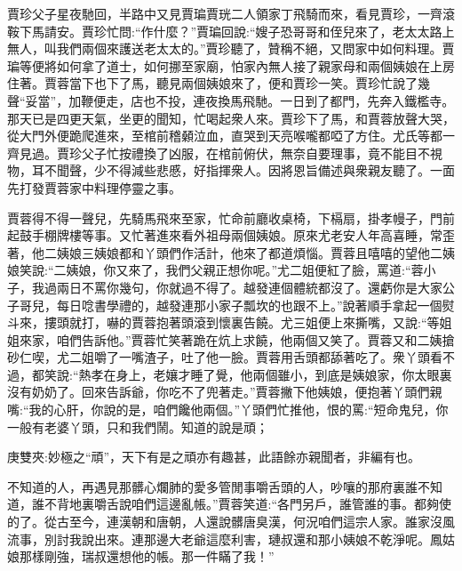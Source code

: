 \begin{parag}
    賈珍父子星夜馳回，半路中又見賈㻞賈珖二人領家丁飛騎而來，看見賈珍，一齊滾鞍下馬請安。賈珍忙問:“作什麼？”賈㻞回說:“嫂子恐哥哥和侄兒來了，老太太路上無人，叫我們兩個來護送老太太的。”賈珍聽了，贊稱不絕，又問家中如何料理。賈㻞等便將如何拿了道士，如何挪至家廟，怕家內無人接了親家母和兩個姨娘在上房住著。賈蓉當下也下了馬，聽見兩個姨娘來了，便和賈珍一笑。賈珍忙說了幾聲“妥當”，加鞭便走，店也不投，連夜換馬飛馳。一日到了都門，先奔入鐵檻寺。那天已是四更天氣，坐更的聞知，忙喝起衆人來。賈珍下了馬，和賈蓉放聲大哭，從大門外便跪爬進來，至棺前稽顙泣血，直哭到天亮喉嚨都啞了方住。尤氏等都一齊見過。賈珍父子忙按禮換了凶服，在棺前俯伏，無奈自要理事，竟不能目不視物，耳不聞聲，少不得減些悲慼，好指揮衆人。因將恩旨備述與衆親友聽了。一面先打發賈蓉家中料理停靈之事。
\end{parag}


\begin{parag}
    賈蓉得不得一聲兒，先騎馬飛來至家，忙命前廳收桌椅，下槅扇，掛孝幔子，門前起鼓手棚牌樓等事。又忙著進來看外祖母兩個姨娘。原來尤老安人年高喜睡，常歪著，他二姨娘三姨娘都和丫頭們作活計，他來了都道煩惱。賈蓉且嘻嘻的望他二姨娘笑說:“二姨娘，你又來了，我們父親正想你呢。”尤二姐便紅了臉，罵道:“蓉小子，我過兩日不罵你幾句，你就過不得了。越發連個體統都沒了。還虧你是大家公子哥兒，每日唸書學禮的，越發連那小家子瓢坎的也跟不上。”說著順手拿起一個熨斗來，摟頭就打，嚇的賈蓉抱著頭滾到懷裏告饒。尤三姐便上來撕嘴，又說:“等姐姐來家，咱們告訴他。”賈蓉忙笑著跪在炕上求饒，他兩個又笑了。賈蓉又和二姨搶砂仁喫，尤二姐嚼了一嘴渣子，吐了他一臉。賈蓉用舌頭都舔著吃了。衆丫頭看不過，都笑說:“熱孝在身上，老孃才睡了覺，他兩個雖小，到底是姨娘家，你太眼裏沒有奶奶了。回來告訴爺，你吃不了兜著走。”賈蓉撇下他姨娘，便抱著丫頭們親嘴:“我的心肝，你說的是，咱們饞他兩個。”丫頭們忙推他，恨的罵:“短命鬼兒，你一般有老婆丫頭，只和我們鬧。知道的說是頑；\begin{note}庚雙夾:妙極之“頑”，天下有是之頑亦有趣甚，此語餘亦親聞者，非編有也。\end{note}不知道的人，再遇見那髒心爛肺的愛多管閒事嚼舌頭的人，吵嚷的那府裏誰不知道，誰不背地裏嚼舌說咱們這邊亂帳。”賈蓉笑道:“各門另戶，誰管誰的事。都夠使的了。從古至今，連漢朝和唐朝，人還說髒唐臭漢，何況咱們這宗人家。誰家沒風流事，別討我說出來。連那邊大老爺這麼利害，璉叔還和那小姨娘不乾淨呢。鳳姑娘那樣剛強，瑞叔還想他的帳。那一件瞞了我！”
\end{parag}


